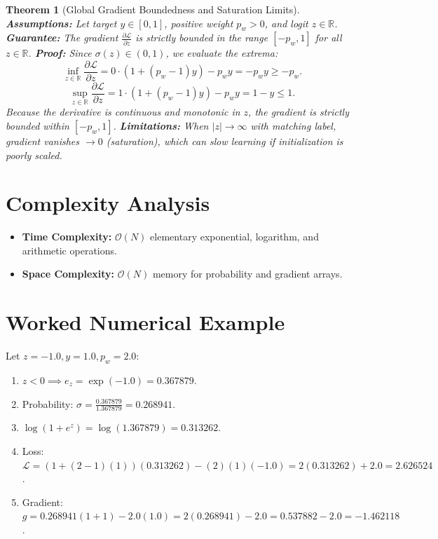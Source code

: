 \documentclass[11pt]{article}
\newtheorem{theorem}{Theorem}
\begin{document}
\begin{theorem}[Global Gradient Boundedness and Saturation Limits]
\label{thm:bce_grad_bound_full}
\textbf{Assumptions:} Let target $y \in [0, 1]$, positive weight $p_w > 0$, and logit $z \in \mathbb{R}$.
\textbf{Guarantee:} The gradient $\frac{\partial \mathcal{L}}{\partial z}$ is strictly bounded in the range $[-p_w, 1]$ for all $z \in \mathbb{R}$.
\textbf{Proof:}
Since $\sigma(z) \in (0, 1)$, we evaluate the extrema:
\begin{equation}
\inf_{z \in \mathbb{R}} \frac{\partial \mathcal{L}}{\partial z} = 0 \cdot (1 + (p_w - 1)y) - p_w y = -p_w y \ge -p_w.
\end{equation}
\begin{equation}
\sup_{z \in \mathbb{R}} \frac{\partial \mathcal{L}}{\partial z} = 1 \cdot (1 + (p_w - 1)y) - p_w y = 1 - y \le 1.
\end{equation}
Because the derivative is continuous and monotonic in $z$, the gradient is strictly bounded within $[-p_w, 1]$.
\textbf{Limitations:} When $|z| \to \infty$ with matching label, gradient vanishes $\to 0$ (saturation), which can slow learning if initialization is poorly scaled.
\end{theorem}

\section{Complexity Analysis}
\label{sec:complexity}

\begin{itemize}
    \item \textbf{Time Complexity:} $\mathcal{O}(N)$ elementary exponential, logarithm, and arithmetic operations.
    \item \textbf{Space Complexity:} $\mathcal{O}(N)$ memory for probability and gradient arrays.
\end{itemize}

\section{Worked Numerical Example}
\label{sec:worked_example}

Let $z = -1.0, y = 1.0, p_w = 2.0$:
\begin{enumerate}
    \item $z < 0 \implies e_z = \exp(-1.0) = 0.367879$.
    \item Probability: $\sigma = \frac{0.367879}{1.367879} = 0.268941$.
    \item $\log(1 + e^z) = \log(1.367879) = 0.313262$.
    \item Loss: $\mathcal{L} = (1 + (2 - 1)(1))(0.313262) - (2)(1)(-1.0) = 2(0.313262) + 2.0 = 2.626524$.
    \item Gradient: $g = 0.268941(1 + 1) - 2.0(1.0) = 2(0.268941) - 2.0 = 0.537882 - 2.0 = -1.462118$.
\end{enumerate}
\end{document}
